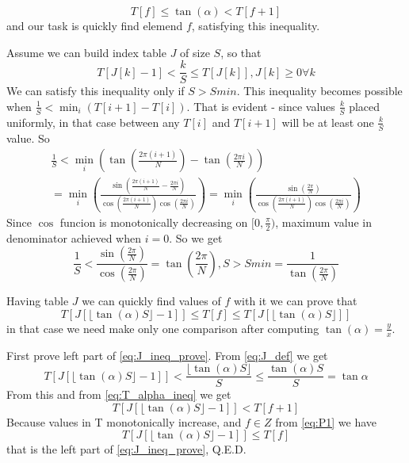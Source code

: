\documentclass{article}
\begin{document}
\begin{equation}
\label{eq:T_alpha_ineq}
T[f] \le \tan(\alpha) < T[f + 1]
\end{equation}
and our task is quickly find elemend $f$, satisfying this inequality.

Assume we can build index table $J$ of size $S$, so that
\begin{equation}
\label{eq:J_def}
T[J[k] - 1] < \frac{k}{S} \leq T[J[k]],
J[k] \geq 0 \forall k
\end{equation}
We can satisfy this inequality only if $S > Smin$.
This inequality becomes possible when $\frac{1}{S} < \min_{i}(T[i + 1] - T[i])$.
That is evident - since values $\frac{k}{S}$ placed uniformly, in that
case between any $T[i]$ and $T[i + 1]$ will be at least one $\frac{k}{S}$ value.
So
\begin{multline}
\frac{1}{S} < \min_{i}(\tan(\frac{2\pi (i + 1)}{N}) - \tan(\frac{2\pi i}{N})) \\
 =  \min_{i}(\frac{\sin(\frac{2\pi (i + 1)}{N} - \frac{2\pi i}{N})}{\cos(\frac{2\pi (i + 1)}{N})\cos(\frac{2\pi i}{N})})
 =  \min_{i}(\frac{\sin(\frac{2\pi}{N})}{\cos(\frac{2\pi (i + 1)}{N})\cos(\frac{2\pi i}{N})})
\end{multline}
Since $\cos$ funcion is monotonically decreasing on $[0, \frac{\pi}{2})$, maximum value in
denominator achieved when $i = 0$. So we get
\begin{equation}
\label{eq:Smin_value}
\frac{1}{S} < \frac{\sin(\frac{2\pi}{N})}{\cos(\frac{2\pi}{N})} = \tan(\frac{2\pi}{N}),
S > Smin = \frac{1}{\tan(\frac{2\pi}{N})}
\end{equation}

Having table $J$ we can quickly find values of $f$ with it we can prove that
\begin{equation}
\label{eq:J_ineq_prove}
T[J[\lfloor \tan(\alpha) S \rfloor - 1]] \leq T[f] \leq T[J[\lfloor \tan(\alpha) S \rfloor]]
\end{equation}
in that case we need make only one comparison after computing $\tan(\alpha) = \frac{y}{x}$.

First prove left part of \eqref{eq:J_ineq_prove}. From \eqref{eq:J_def} we get
\begin{equation}
T[J[\lfloor \tan(\alpha) S \rfloor - 1]] < \frac{\lfloor \tan(\alpha) S \rfloor}{S} \leq \frac{\tan(\alpha)S}{S} = \tan\alpha
\end{equation}
From this and from \eqref{eq:T_alpha_ineq} we get
\begin{equation}
\label{eq:P1}
T[J[\lfloor \tan(\alpha) S \rfloor - 1]] < T[f + 1]
\end{equation}
Because values in T monotonically increase, and $f \in Z$ from \eqref{eq:P1} we have
\begin{equation}
T[J[\lfloor \tan(\alpha) S \rfloor - 1]] \leq T[f]
\end{equation}
that is the left part of \eqref{eq:J_ineq_prove}, Q.E.D.
\end{document}
